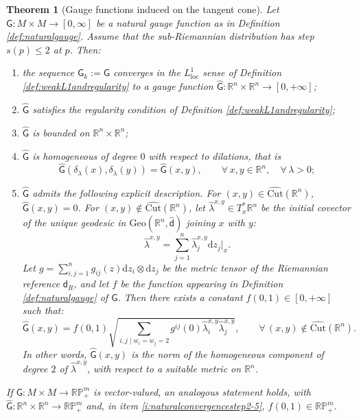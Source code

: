 \documentclass[11pt,a4paper]{article}
\theoremstyle{plain}
\newtheorem{theorem}{Theorem}[section]
\theoremstyle{definition}
\theoremstyle{remark}
\numberwithin{equation}{section}
\newcommand{\R}{\mathbb{R}} %
\newcommand{\RP}{\mathbb{RP}} %
\newcommand{\Cut}{\mathrm{Cut}}
\newcommand{\Geo}{\mathrm{Geo}}
\newcommand{\loc}{\mathrm{loc}}
\newcommand{\di}{\mathrm{d}}
\newcommand{\sfd}{\mathsf d}
\newcommand{\sfG}{\mathsf G}
\begin{document}
\begin{theorem}[Gauge functions induced on the tangent cone]
Let $\sfG : M\times M\to [0,\infty]$ be a natural gauge function as in Definition \ref{def:naturalgauge}. Assume that the sub-Riemannian distribution has step $s(p)\leq 2$ at $p$. Then:
\begin{enumerate}[label = (\roman*)]
\item \label{i:naturalconvergencestep2-1} the sequence $\sfG_k := \sfG$ converges in the $L^1_{\loc}$ sense of Definition \ref{def:weakL1andregularity} to a gauge function $\hat{\sfG} : \R^n\times \R^n \to [0,+\infty]$;
\item \label{i:naturalconvergencestep2-2} $\hat{\sfG}$ satisfies the regularity condition of Definition \ref{def:weakL1andregularity};
\item \label{i:naturalconvergencestep2-3} $\hat{\sfG}$ is bounded on $\R^n\times \R^n$;
\item \label{i:naturalconvergencestep2-4} $\hat{\sfG}$ is homogeneous of degree $0$ with respect to dilations, that is
\begin{equation}
\hat{\sfG}(\delta_\lambda(x),\delta_\lambda(y)) = \hat{\sfG}(x,y),\qquad \forall\, x,y\in \R^n, \quad \forall\, \lambda >0;
\end{equation}
\item \label{i:naturalconvergencestep2-5} $\hat{\sfG}$ admits the following explicit description. For $(x,y) \in \widehat{\Cut}(\R^n)$, $\hat{\sfG}(x,y)=0$. For $(x,y)\notin \widehat{\Cut}(\R^n)$, let $\hat{\lambda}^{x,y}\in T_x^*\R^n$ be the initial covector of the unique geodesic in $\Geo(\R^n,\hat{\sfd})$ joining $x$ with $y$:
\begin{equation}
\hat{\lambda}^{x,y} = \sum_{j=1}^n \hat{\lambda}_j^{x,y} \di z_j|_x.
\end{equation}
Let $g=\sum_{i,j=1}^n g_{ij}(z)\di z_i\otimes \di z_j$ be the metric tensor of the Riemannian reference $\sfd_R$, and let $f$ be the function appearing in Definition \ref{def:naturalgauge} of $\sfG$. Then there exists a constant $f(0,1)\in [0,+\infty]$ such that:
\begin{equation}
\hat{\sfG}(x,y) = f(0,1) \sqrt{\sum_{i,j \mid w_i=w_j=2} g^{ij}(0) \hat{\lambda}_i^{x,y} \hat{\lambda}_j^{x,y}}, \qquad \forall\, (x,y)\notin \widehat{\Cut}(\R^n).
\end{equation}
In other words, $\hat{\sfG}(x,y)$ is the norm of the homogeneous component of degree $2$ of $\hat{\lambda}^{x,y}$, with respect to a suitable metric on $\R^n$.
\end{enumerate}
If $\sfG:M\times M \to \RP^m_+$ is vector-valued, an analogous statement holds, with $\hat{\sfG}:\R^n\times \R^n \to \RP^m_+$ and, in item \ref{i:naturalconvergencestep2-5}, $f(0,1)\in \RP^m_+$.
\end{theorem}
\end{document}
